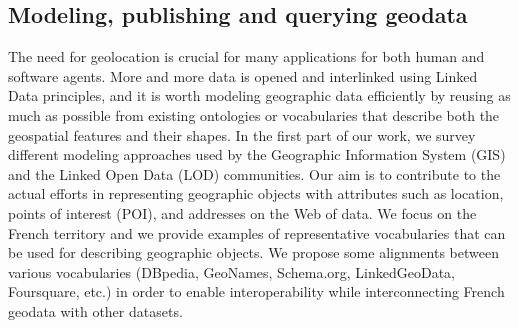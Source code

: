 \subsection{Modeling, publishing and querying geodata}
The need for geolocation is crucial for many applications for both human and software agents. More and more data is opened and interlinked using Linked Data principles, and it is worth modeling geographic data efficiently by reusing as much as possible from existing ontologies or vocabularies that describe both the geospatial features and their shapes. In the first part of our work, we survey different modeling approaches used by the Geographic Information System (GIS) and the Linked Open Data (LOD) communities. Our aim is to contribute to the actual efforts in representing geographic objects with attributes such as location, points of interest (POI), and addresses on the Web of data. We focus on the French territory and we provide examples of representative vocabularies that can be used for describing geographic objects. We propose some alignments between various vocabularies (DBpedia, GeoNames, Schema.org, LinkedGeoData, Foursquare, etc.) in order to enable interoperability while interconnecting French geodata with other datasets. 

